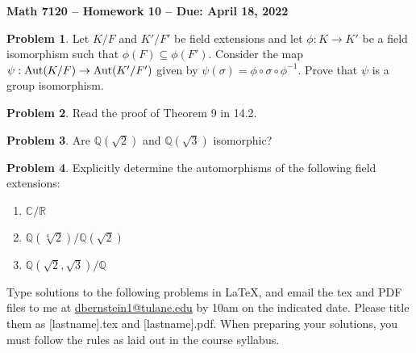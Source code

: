 \documentclass[letterpaper,11pt]{amsart}
\theoremstyle{plain}
\theoremstyle{definition}
\newtheorem{pr}{Problem}
\theoremstyle{remark}
\begin{document}
\Large

\begin{center}
{\bf Math 7120 -- Homework  10 --  Due:  April 18, 2022}
\end{center}

\normalsize

\medskip



\begin{pr}
    Let $K/F$ and $K'/F'$ be field extensions and let $\phi: K\rightarrow K'$ be a field isomorphism such that $\phi(F) \subseteq \phi(F')$.
    Consider the map $\psi: {\rm Aut}(K/F)\rightarrow {\rm Aut}(K'/F')$ given by $\psi(\sigma) = \phi \circ \sigma \circ \phi^{-1}$.
    Prove that $\psi$ is a group isomorphism.
\end{pr}

\begin{pr}
    Read the proof of Theorem 9 in 14.2.
\end{pr}



\begin{pr}
    Are $\mathbb{Q}(\sqrt{2})$ and $\mathbb{Q}(\sqrt{3})$ isomorphic?
\end{pr}

\begin{pr}
    Explicitly determine the automorphisms of the following field extensions:
    \begin{enumerate}
        \item $\mathbb{C}/\mathbb{R}$
        \item $\mathbb{Q}(\sqrt[4]{2})/\mathbb{Q}(\sqrt{2})$
        \item $\mathbb{Q}(\sqrt{2},\sqrt{3})/\mathbb{Q}$
    \end{enumerate}
\end{pr}




\bigskip

Type solutions to the following problems in \LaTeX, and email the tex and PDF files to me at \url{dbernstein1@tulane.edu} by 10am on the indicated date.
Please title them as [lastname].tex and [lastname].pdf.
When preparing your solutions, you must follow the rules as laid out in the course syllabus.

\vspace{.5cm}

\end{document}
